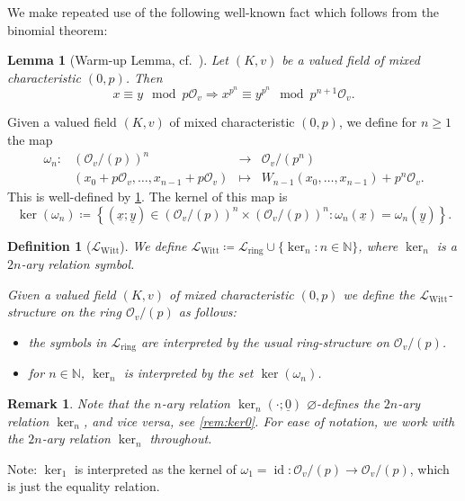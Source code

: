 \documentclass[a4paper]{amsart}
\theoremstyle{mystyle2}
\newtheorem{lem}[thm]{Lemma}
\theoremstyle{mystyle}
\newtheorem{defi}[thm]{Definition}
\newtheorem{rem}[thm]{Remark}
\DeclareMathOperator{\id}{id}
\renewcommand{\emptyset}{\varnothing}
\renewcommand{\vec}[1]{\underline{#1}}
\newcommand{\map}[1]{\omega_{#1}}
\newcommand{\N}{\mathbb{N}}
\renewcommand{\L}{\mathcal{L}}
\newcommand{\Lring}{\L_{\mathrm{ring}}}
\newcommand{\LWitt}{\L_{\mathrm{Witt}}}
\renewcommand{\O}{\mathcal{O}}
\numberwithin{equation}{section}
\begin{document}
    We make repeated use of the following well-known fact which follows from the binomial theorem:
    \begin{lem}[Warm-up Lemma, cf.~{\cite[\S 4.II, Lemme 1]{serre1968corps}}]
        \label{lem:warm.up}
        Let $(K,v)$ be a valued field of mixed characteristic $(0,p)$. 
        Then
        \[x\equiv y \mod p\O_v \Longrightarrow x^{p^n}\equiv y^{p^n}\mod p^{n+1}\O_v.\]
    \end{lem}
    Given a valued field $(K,v)$ of mixed characteristic $(0,p)$, we define for $n \geq 1$ the map
    \[
    \begin{array}{rrcl}
    \map{n}\colon &\left(\O_v/(p)\right)^n & \longrightarrow & \O_v/(p^n)\\
    &(x_0+p\O_v,\ldots,x_{n-1}+p\O_v) & \longmapsto & W_{n-1}(x_0,\ldots,x_{n-1})+p^n\O_v.
    \end{array}
    \]
    This is well-defined by \cref{lem:warm.up}.
    The kernel of this map is 
    \[
    \ker(\map{n})\coloneqq \left\{(\vec{x};\vec{y})\in \left(\O_v/(p)\right)^n\times \left(\O_v/(p)\right)^n : \map{n}(\vec{x})=\map{n}(\vec{y})\right\}.
    \]

    \begin{defi}[\(\LWitt\)]
        We define \(\LWitt\coloneqq \Lring \cup \{ \ker_n \colon n\in \N \}\), where \(\ker_n\) is a \(2n\)-ary relation symbol.

        Given a valued field \( (K,v) \) of mixed characteristic $(0,p)$ we define the \(\LWitt\)-structure on the ring \(\O_v/(p)\) as follows:
        \begin{itemize}
            \item the symbols in \(\Lring\) are interpreted by the usual ring-structure on \(\O_v/(p)\).
            \item for \(n\in \N\), \(\ker_n\) is interpreted by the set \(\ker(\map{n})\).
        \end{itemize}
    \end{defi}

    \begin{rem}
        Note that the $n$-ary relation $\ker_n(\cdot;\vec{0})$ $\emptyset$-defines the $2n$-ary relation $\ker_n$, and vice versa, see \cref{rem:ker0}. 
        For ease of notation, we 
        work with the \(2n\)-ary relation $\ker_n$ throughout. \label{rem:kern}
    \end{rem}
    
    Note: \(\ker_1\) is interpreted as the kernel of \(\map{1}=\id\colon \O_v/(p) \to \O_v/(p)\), which is just the equality relation.
\end{document}
